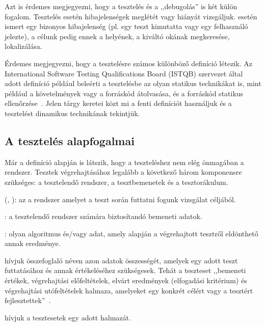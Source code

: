 Azt is érdemes megjegyezni, hogy a tesztelés és a ,,debugolás'' is két külön fogalom. Tesztelés esetén hibajelenségek meglétét vagy hiányát vizsgáljuk.  esetén ismert egy bizonyos hibajelenség (pl. egy teszt kimutatta vagy egy felhasználó jelezte), a célunk pedig ennek a helyének, a kiváltó okának megkeresése, lokalizálása.

\begin{megjegyzes}
Érdemes megjegyezni, hogy a tesztelésre számos különböző definíció létezik. Az International Software Testing Qualifications Board (ISTQB) szervezet által adott definíció például beleérti a tesztelésbe az olyan statikus technikákat is, mint például a követelmények vagy a forráskód átolvasása, és a forráskód statikus ellenőrzése~\cite{ISTQB_syllabus}. Jelen tárgy keretei közt mi a fenti definíciót használjuk és a tesztelést dinamikus technikának tekintjük.
\end{megjegyzes}

\subsection{A tesztelés alapfogalmai}
Már a definíció alapján is látszik, hogy a teszteléshez nem elég önmagában a rendszer. Tesztek végrehajtásához legalább a következő három komponensre szükséges: a tesztelendő rendszer, a tesztbemenetek és a tesztorákulum.

\begin{definicio}
 (, ): az a rendszer amelyet a teszt során futtatni fogunk vizsgálat céljából.
\end{definicio}
\begin{definicio}
: a tesztelendő rendszer számára biztosítandó bemeneti adatok.
\end{definicio}
\begin{definicio}
: olyan algoritmus és/vagy adat, amely alapján a végrehajtott tesztről eldönthető annak eredménye.
\end{definicio}


\begin{definicio}
 hívjuk összefoglaló néven azon adatok összességét, amelyek egy adott teszt futtatásához és annak értékeléséhez szükségesek. Tehát a teszteset ,,bemeneti értékek, végrehajtási előfeltételek, elvárt eredmények (elfogadási kritérium) és végrehajtási utófeltételek halmaza, amelyeket egy konkrét célért vagy a tesztért fejlesztettek''~\cite{HTB-glossary,IEEE-24765}.
\end{definicio}
\begin{definicio}
 hívjuk a tesztesetek egy adott halmazát.
\end{definicio}

